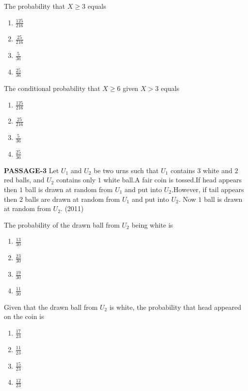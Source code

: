 	 \item The probability that $X\ge3$ equals 
		 \begin{enumerate}
				 \item $\frac{125}{216}$
				 \item $\frac{25}{216}$
				 \item $\frac{5}{36}$
				 \item $\frac{25}{36}$
		 \end{enumerate}
	 \item The conditional probability that $X\ge6$ given $X>3$ equals
		 \begin{enumerate}
				 \item $\frac{125}{216}$
				 \item $\frac{25}{216}$
				 \item $\frac{5}{36}$
				 \item $\frac{25}{36}$
		 \end{enumerate}
		 \textbf{PASSAGE-3}
Let $U_1$ and $U_2$ be two urns such that $U_1$ contains $3$ white and $2$ red balls, and $U_2$ contains only $1$ white ball.A fair coin is tossed.If head appears then $1$ ball is drawn at random from $U_1$ and put into $U_2$.However, if tail appears then $2$ balls are drawn at random from $U_1$ and put into $U_2$. Now $1$ ball is drawn at random from $U_2$. \hfill(2011)
         \item The probability of the drawn ball from $U_2$ being white is
		 \begin{enumerate}
				 \item $\frac{13}{30}$
				 \item $\frac{23}{30}$
				 \item $\frac{19}{30}$
				 \item $\frac{11}{30}$
		 \end{enumerate}
	 \item Given that the drawn ball from $U_2$ is white, the probability that head appeared on the coin is 
		 \begin{enumerate}
				 \item $\frac{17}{23}$
				 \item $\frac{11}{23}$
				 \item $\frac{15}{23}$
				 \item $\frac{12}{23}$
		 \end{enumerate}

